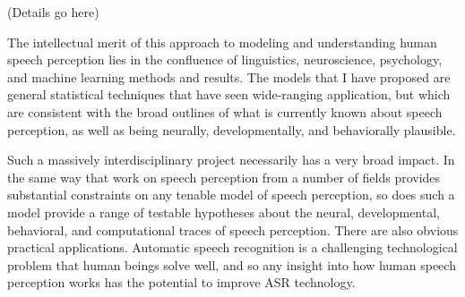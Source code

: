 \documentclass[12pt]{article}
\begin{document}
(Details go here)


The intellectual merit of this approach to modeling and understanding human speech perception lies in the confluence of linguistics, neuroscience, psychology, and machine learning methods and results.  The models that I have proposed are general statistical techniques that have seen wide-ranging application, but which are consistent with the broad outlines of what is currently known about speech perception, as well as being neurally, developmentally, and behaviorally plausible.

Such a massively interdisciplinary project necessarily has a very broad impact.  In the same way that work on speech perception from a number of fields provides substantial constraints on any tenable model of speech perception, so does such a model provide a range of testable hypotheses about the neural, developmental, behavioral, and computational traces of speech perception.  There are also obvious practical applications.  Automatic speech recognition is a challenging technological problem that human beings solve well, and so any insight into how human speech perception works has the potential to improve ASR technology.  
\end{document}
